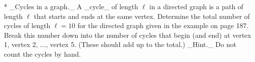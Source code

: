 * _Cycles in a graph._ A _cycle_ of length \(\ell\) in a directed graph is a path of length \(\ell\) that starts and ends at the same vertex. Determine the total number of cycles of length \(\ell=10\) for the directed graph given in the example on page 187. Break this number down into the number of cycles that begin (and end) at vertex 1, vertex 2, ..., vertex 5. (These should add up to the total.) _Hint._ Do not count the cycles by hand.

 